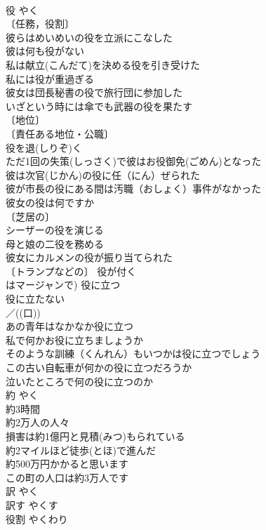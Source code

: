 \documentclass[8pt]{extreport}
\begin{document}
\begin{CJK}{UTF8}{min}
\\	役	やく	
\\	〔任務，役割〕
\\	彼らはめいめいの役を立派にこなした 
\\	彼は何も役がない 
\\	私は献立(こんだて)を決める役を引き受けた 
\\	私には役が重過ぎる 
\\	彼女は団長秘書の役で旅行団に参加した 
\\	いざという時には傘でも武器の役を果たす 
\\	〔地位〕
\\	〔責任ある地位・公職〕
\\	役を退(しりぞ)く 
\\	ただ1回の失策(しっさく)で彼はお役御免(ごめん)となった 
\\	彼は次官(じかん)の役に任（にん）ぜられた 
\\	彼が市長の役にある間は汚職（おしょく）事件がなかった 
\\	彼女の役は何ですか 
\\	〔芝居の〕
\\	シーザーの役を演じる 
\\	母と娘の二役を務める 
\\	彼女にカルメンの役が振り当てられた 
\\	〔トランプなどの〕 役が付く 
\\	はマージャンで) 役に立つ 
\\	役に立たない 
\\	／((口)) 
\\	あの青年はなかなか役に立つ 
\\	私で何かお役に立ちましょうか 
\\	そのような訓練（くんれん）もいつかは役に立つでしょう 
\\	この古い自転車が何かの役に立つだろうか 
\\	泣いたところで何の役に立つのか 
\\	約	やく	
\\	約3時間 
\\	約2万人の人々 
\\	損害は約1億円と見積(みつ)もられている 
\\	約2マイルほど徒歩(とほ)で進んだ 
\\	約500万円かかると思います 
\\	この町の人口は約3万人です 
\\	訳	やく	
\\	訳す	やくす	
\\	役割	やくわり	

\end{CJK}
\end{document}
